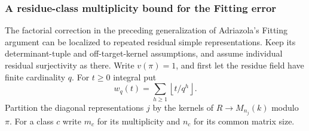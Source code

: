 \subsubsection{A residue-class multiplicity bound for the Fitting error}
\label{sec:adriazola-fitting-multiplicity}
The factorial correction in the preceding generalization of
Adriazola's Fitting argument \cite{adriazola-reconstruction}
can be localized to repeated residual simple representations.
Keep its determinant-tuple and off-target-kernel assumptions,
and assume individual residual surjectivity as there.
Write \(v(\pi)=1\), and first let the residue field have finite
cardinality \(q\). For \(t\ge0\) integral put
\[
 w_q(t)=\sum_{h\ge1}\left\lfloor t/q^h\right\rfloor .
\]
Partition the diagonal representations \(j\) by the kernels of
\(R\to M_{n_j}(k)\) modulo \(\pi\). For a class \(c\) write \(m_c\)
for its multiplicity and \(n_c\) for its common matrix size.

